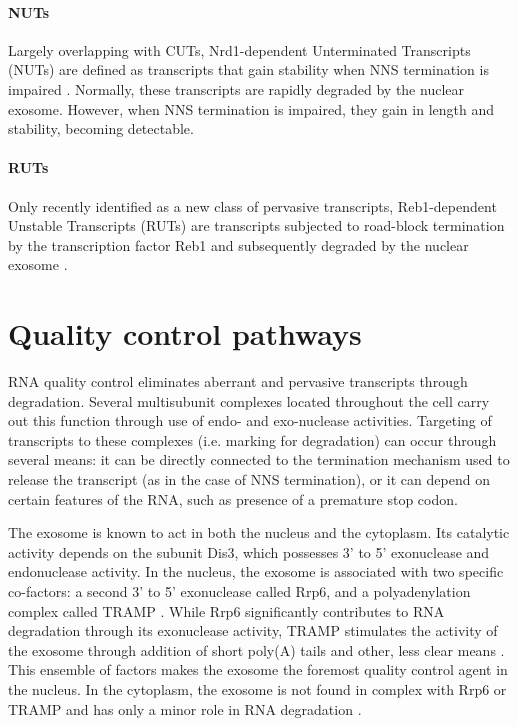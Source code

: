 \paragraph{NUTs}

Largely overlapping with CUTs, Nrd1-dependent Unterminated Transcripts (NUTs) are defined as transcripts that gain stability when NNS termination is impaired \cite{schulz:2013:transcriptome}. 
Normally, these transcripts are rapidly degraded by the nuclear exosome. 
However, when NNS termination is impaired, they gain in length and stability, becoming detectable.

\paragraph{RUTs}

Only recently identified as a new class of pervasive transcripts, Reb1-dependent Unstable Transcripts (RUTs) are transcripts subjected to road-block termination by the transcription factor Reb1 and subsequently degraded by the nuclear exosome \cite{colin:2014:roadblock}.

\section{Quality control pathways}

RNA quality control eliminates aberrant and pervasive transcripts through degradation. 
Several multisubunit complexes located throughout the cell carry out this function through use of endo- and exo-nuclease activities. 
Targeting of transcripts to these complexes (i.e. marking for degradation) can occur through several means: it can be directly connected to the termination mechanism used to release the transcript (as in the case of NNS termination), or it can depend on certain features of the RNA, such as presence of a premature stop codon.

The exosome is known to act in both the nucleus and the cytoplasm. 
Its catalytic activity depends on the subunit Dis3, which possesses 3' to 5' exonuclease and endonuclease activity. In the nucleus, the exosome is associated with two specific co-factors: a second 3' to 5' exonuclease called Rrp6, and a polyadenylation complex called TRAMP \cite{lacava:2005:rna}. 
While Rrp6 significantly contributes to RNA degradation through its exonuclease activity, TRAMP stimulates the activity of the exosome through addition of short poly(A) tails and other, less clear means \cite{haracska:2005:trf4,jia:2012:rna}. 
This ensemble of factors makes the exosome the foremost quality control agent in the nucleus. 
In the cytoplasm, the exosome is not found in complex with Rrp6 or TRAMP and has only a minor role in RNA degradation \cite[for review see][]{tudek:2015:noncoding}.

